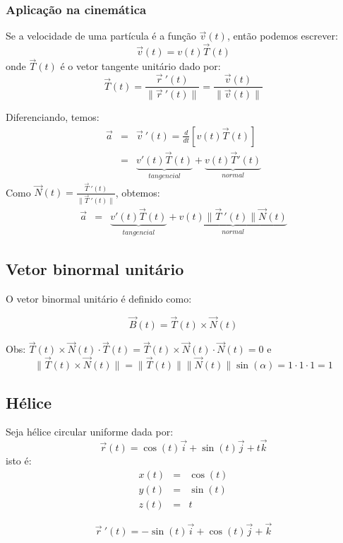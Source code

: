 \documentclass[a4paper,10pt]{book}
\begin{document}
 
\subsubsection{Aplicação na cinemática}
Se a velocidade de uma partícula é a função $\vec{v}(t)$, então podemos escrever:
 $$\vec{v}(t)=v(t)\vec{T}(t)$$
onde $\vec{T}(t)$ é o vetor tangente unitário dado por:
$$\vec{T}(t) = \frac{\vec{r}~\!'(t)}{\|\vec{r}~\!'(t)\|}=\frac{\vec{v}(t)}{\|\vec{v}(t)\|} $$

Diferenciando, temos:
\begin{eqnarray*}
 \vec{a}&=&\vec{v}~\!'(t)=\frac{d}{dt}\left[v(t)\vec{T}(t)\right]\\
 &=&\underbrace{v'(t)\vec{T}(t)}_{tangencial}+\underbrace{v(t)\vec{T}'(t)}_{normal}
\end{eqnarray*}
Como $\vec{N}(t) = \frac{\vec{T}~\!'(t)}{\|\vec{T}~\!'(t)\|}$, obtemos:
\begin{eqnarray*}
 \vec{a}&=&\underbrace{v'(t)\vec{T}(t)}_{tangencial}+\underbrace{v(t)\|\vec{T}~\!'(t)\|\vec{N}(t)}_{normal}
\end{eqnarray*}
 
\subsection{Vetor binormal unitário}
O vetor binormal unitário é definido como:

 $$\vec{B}(t)=\vec{T}(t)\times\vec{N}(t)$$

 Obs: $\vec{T}(t)\times\vec{N}(t)\cdot \vec{T}(t) = \vec{T}(t)\times\vec{N}(t)\cdot \vec{N}(t)=0$ e
 $$\|\vec{T}(t)\times\vec{N}(t)\|=\|\vec{T}(t)\|\|\vec{N}(t)\|\sin(\alpha)=1\cdot 1 \cdot 1=1$$

\subsection{Hélice}
Seja  hélice circular uniforme dada por:
$$\vec{r}(t)=\cos(t)\vec{i}+\sin(t)\vec{j}+ t\vec{k}$$
isto é:
\begin{eqnarray*}
 x(t)&=&\cos(t)\\
 y(t)&=&\sin(t)\\
 z(t)&=&t
\end{eqnarray*}

$$\vec{r}\!~'(t)=-\sin(t)\vec{i}+\cos(t)\vec{j}+ \vec{k}$$
\end{document}
